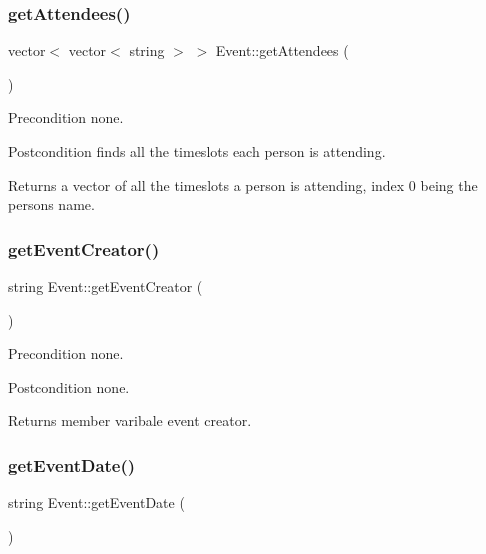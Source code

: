 \subsubsection{\texorpdfstring{get\+Attendees()}{getAttendees()}}
{\footnotesize\ttfamily vector$<$ vector$<$ string $>$ $>$ Event\+::get\+Attendees (\begin{DoxyParamCaption}{ }\end{DoxyParamCaption})}

\begin{DoxyPrecond}{Precondition}
none. 
\end{DoxyPrecond}
\begin{DoxyPostcond}{Postcondition}
finds all the timeslots each person is attending. 
\end{DoxyPostcond}
\begin{DoxyReturn}{Returns}
a vector of all the timeslots a person is attending, index 0 being the person\textquotesingle{}s name. 
\end{DoxyReturn}
\mbox{\label{class_event_adc4d66c8a57d4e94b483ba39bbf0cf6c}} 
\subsubsection{\texorpdfstring{get\+Event\+Creator()}{getEventCreator()}}
{\footnotesize\ttfamily string Event\+::get\+Event\+Creator (\begin{DoxyParamCaption}{ }\end{DoxyParamCaption})}

\begin{DoxyPrecond}{Precondition}
none. 
\end{DoxyPrecond}
\begin{DoxyPostcond}{Postcondition}
none. 
\end{DoxyPostcond}
\begin{DoxyReturn}{Returns}
member varibale event creator. 
\end{DoxyReturn}
\mbox{\label{class_event_a91ec497b9aad58f22638b673a90f6cb9}} 
\subsubsection{\texorpdfstring{get\+Event\+Date()}{getEventDate()}}
{\footnotesize\ttfamily string Event\+::get\+Event\+Date (\begin{DoxyParamCaption}{ }\end{DoxyParamCaption})}

